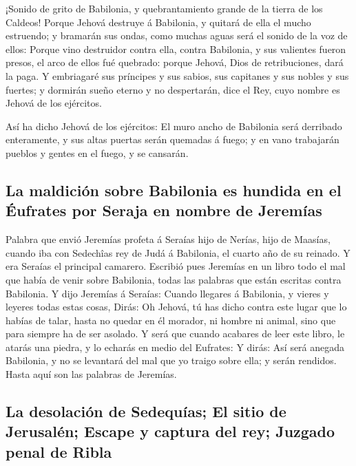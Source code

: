  ¡Sonido de grito de Babilonia, y quebrantamiento grande de
la tierra de los Caldeos!  Porque Jehová destruye á
Babilonia, y quitará de ella el mucho estruendo; y bramarán sus ondas,
como muchas aguas será el sonido de la voz de ellos: 
Porque vino destruidor contra ella, contra Babilonia, y sus valientes
fueron presos, el arco de ellos fué quebrado: porque Jehová, Dios de
retribuciones, dará la paga.  Y embriagaré sus príncipes y
sus sabios, sus capitanes y sus nobles y sus fuertes; y dormirán sueño
eterno y no despertarán, dice el Rey, cuyo nombre es Jehová de los
ejércitos.

 Así ha dicho Jehová de los ejércitos: El muro ancho de
Babilonia será derribado enteramente, y sus altas puertas serán quemadas
á fuego; y en vano trabajarán pueblos y gentes en el fuego, y se
cansarán.

\hypertarget{la-maldiciuxf3n-sobre-babilonia-es-hundida-en-el-uxe9ufrates-por-seraja-en-nombre-de-jeremuxedas}{%
\subsection{La maldición sobre Babilonia es hundida en el Éufrates por
Seraja en nombre de
Jeremías}\label{la-maldiciuxf3n-sobre-babilonia-es-hundida-en-el-uxe9ufrates-por-seraja-en-nombre-de-jeremuxedas}}

 Palabra que envió Jeremías profeta á Seraías hijo de
Nerías, hijo de Maasías, cuando iba con Sedechîas rey de Judá á
Babilonia, el cuarto año de su reinado. Y era Seraías el principal
camarero.  Escribió pues Jeremías en un libro todo el mal
que había de venir sobre Babilonia, todas las palabras que están
escritas contra Babilonia.  Y dijo Jeremías á Seraías:
Cuando llegares á Babilonia, y vieres y leyeres todas estas cosas,
 Dirás: Oh Jehová, tú has dicho contra este lugar que lo
habías de talar, hasta no quedar en él morador, ni hombre ni animal,
sino que para siempre ha de ser asolado.  Y será que cuando
acabares de leer este libro, le atarás una piedra, y lo echarás en medio
del Eufrates:  Y dirás: Así será anegada Babilonia, y no se
levantará del mal que yo traigo sobre ella; y serán rendidos. Hasta aquí
son las palabras de Jeremías.

\hypertarget{la-desolaciuxf3n-de-sedequuxedas-el-sitio-de-jerusaluxe9n-escape-y-captura-del-rey-juzgado-penal-de-ribla}{%
\subsection{La desolación de Sedequías; El sitio de Jerusalén; Escape y
captura del rey; Juzgado penal de
Ribla}\label{la-desolaciuxf3n-de-sedequuxedas-el-sitio-de-jerusaluxe9n-escape-y-captura-del-rey-juzgado-penal-de-ribla}}

